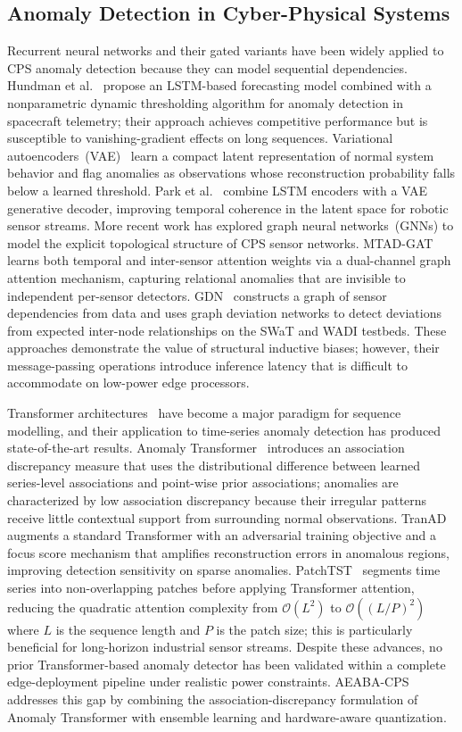 \documentclass[pdflatex,sn-mathphys-num]{sn-jnl}
\theoremstyle{thmstyleone}
\theoremstyle{thmstyletwo}
\theoremstyle{thmstylethree}
\begin{document}
\subsection{Anomaly Detection in Cyber-Physical Systems}
Recurrent neural networks and their gated variants have been widely applied to CPS anomaly detection because they can model sequential dependencies.
Hundman et al.~\cite{hundman2018detecting} propose an LSTM-based forecasting model combined with a nonparametric dynamic thresholding algorithm for anomaly detection in spacecraft telemetry; their approach achieves competitive performance but is susceptible to vanishing-gradient effects on long sequences.
Variational autoencoders~(VAE)~\cite{kingma2013auto} learn a compact latent representation of normal system behavior and flag anomalies as observations whose reconstruction probability falls below a learned threshold. Park et al.~\cite{park2018multimodal} combine LSTM encoders with a VAE generative decoder, improving temporal coherence in the latent space for robotic sensor streams. More recent work has explored graph neural networks~(GNNs) to model the explicit topological structure of CPS sensor networks.
MTAD-GAT~\cite{zhao2020multivariate} learns both temporal and inter-sensor attention weights via a dual-channel graph attention mechanism, capturing relational anomalies that are invisible to independent per-sensor detectors. GDN~\cite{deng2021graph} constructs a graph of sensor dependencies from data and uses graph deviation networks to detect deviations from expected inter-node relationships on the SWaT and WADI testbeds. These approaches demonstrate the value of structural inductive biases; however, their message-passing operations introduce inference latency that is difficult to accommodate on low-power edge processors.

Transformer architectures~\cite{vaswani2017attention} have become a major paradigm for sequence modelling, and their application to time-series anomaly detection has produced state-of-the-art results. Anomaly Transformer~\cite{xu2022anomaly} introduces an association discrepancy measure that uses the distributional difference between learned series-level associations and point-wise prior associations; anomalies are characterized by low association discrepancy because their irregular patterns receive little contextual support from surrounding normal observations. TranAD~\cite{tuli2022tranad} augments a standard Transformer with an adversarial training objective and a focus score mechanism that amplifies reconstruction errors in anomalous regions, improving detection sensitivity on sparse anomalies. 
PatchTST~\cite{nie2022time} segments time series into non-overlapping patches before applying Transformer attention, reducing the quadratic attention complexity from $\mathcal{O}(L^2)$ to $\mathcal{O}((L/P)^2)$ where $L$ is the sequence length and $P$ is the patch size; this is particularly beneficial for long-horizon industrial sensor streams.
Despite these advances, no prior Transformer-based anomaly detector has been validated within a complete edge-deployment pipeline under realistic power constraints. AEABA-CPS addresses this gap by combining the association-discrepancy formulation of Anomaly Transformer with ensemble learning and hardware-aware quantization. 
\end{document}
